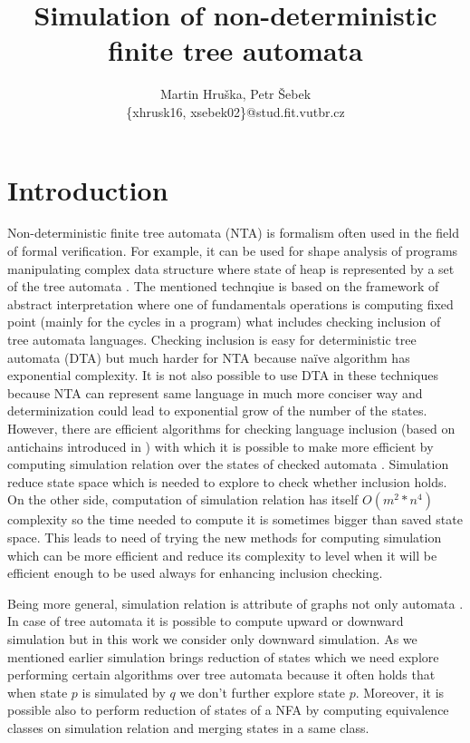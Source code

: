 \documentclass[a4paper, 12pt]{article}
\title{Simulation of non-deterministic finite tree automata}
\author{Martin Hruška, Petr Šebek\\\{xhrusk16, xsebek02\}@stud.fit.vutbr.cz}
\date{}
\begin{document}
\maketitle

\section{Introduction}
\label{sec:intro}

Non-deterministic finite tree automata (NTA) is formalism often used in the field of formal verification.
For example, it can be used for shape analysis of programs manipulating complex data structure where
state of heap is represented by a set of the tree automata \cite{methods12}.
The mentioned technqiue is based on the framework of abstract interpretation where one of fundamentals
operations is computing fixed point (mainly for the cycles in a program) what includes checking inclusion of
tree automata languages.
Checking inclusion is easy for deterministic tree automata (DTA) but much harder for NTA because
na{\"i}ve algorithm has exponential complexity.
It is not also possible to use DTA in these techniques because NTA can represent same language in much more
conciser way and determinization could lead to exponential grow of the  number of the states.
However, there are efficient algorithms for checking language inclusion (based on antichains introduced in \cite{tacas10})
with which it is possible to make more efficient by computing simulation relation over the states of checked automata \cite{tacas10}.
Simulation reduce state space which is needed to explore to check whether inclusion holds.
On the other side, computation of simulation relation has itself $O(m^2*n^4)$ complexity so the time needed
to compute it is sometimes bigger than saved state space.
This leads to need of trying the new methods for computing simulation which can be more efficient and
reduce its complexity to level when it will be efficient enough to be used always for enhancing inclusion checking. 

Being more general, simulation relation is attribute of graphs not only automata \cite{focs95, tacas08}.
In case of tree automata it is possible to compute upward or downward simulation but in this
work we consider only downward simulation.
As we mentioned earlier simulation brings reduction of states which we need explore performing
certain algorithms over tree automata because it often holds that when state $p$ is simulated by $q$
we don't further explore state $p$.
Moreover, it is possible also to perform reduction of states of a NFA by computing
equivalence classes on simulation relation and merging states in a same class.
\end{document}
